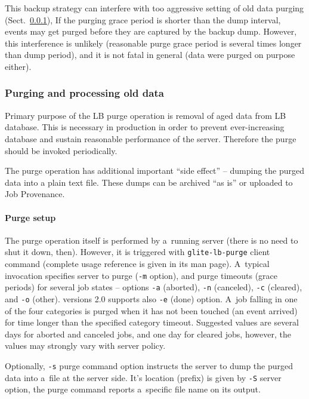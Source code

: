This backup strategy can interfere with too aggressive setting of old
data purging (Sect.~\ref{run:purge}), 
If the purging grace period is shorter than the dump interval,
events may get purged before they are captured by the backup dump.
However, this interference is unlikely (reasonable purge grace period
is several times longer than dump period),
and it is not fatal in general (data were purged on purpose either).

\subsubsection{Purging and processing old data}
\label{run:purge}

Primary purpose of the LB purge operation  is removal of aged data from LB database. This is necessary in
production in order to prevent ever-increasing database and sustain reasonable
performance of the server. Therefore the purge should be invoked periodically.

The purge operation has additional important ``side effect'' -- dumping the
purged data into a plain text file. These dumps can be archived ``as is'' or
uploaded to Job Provenance. 

\paragraph{Purge setup}

The purge operation itself is performed by a~running \LB server
(there is no need to shut it down, then).
However, it is triggered with \verb'glite-lb-purge' client command
(complete usage reference is given in its man page).
A~typical invocation specifies \LB server to purge (\verb'-m' option),
and purge timeouts (grace periods) for several job states -- options
\verb'-a' (aborted), \verb'-n' (canceled), \verb'-c' (cleared), and
\verb'-o' (other). \LB versions 2.0 supports also \verb'-e' (done) option.
A~job falling in one of the four categories is purged when it has not been
touched (\ie an event arrived) for time longer than the specified category
timeout.
Suggested values are several days for aborted and canceled jobs,
and one day for cleared jobs, however, the values may strongly vary
with \LB server policy.

Optionally, \verb'-s' purge command option instructs the server to
dump the purged data into a~file at the server side.
It's location (prefix) is given by \verb'-S' server option,
the purge command reports a~specific file name on its output.

